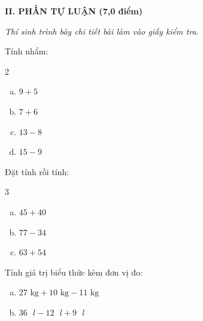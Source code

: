 \vspace{4mm}
\textbf{\large II. PHẦN TỰ LUẬN (7,0 điểm)}

{\itshape Thí sinh trình bày chi tiết bài làm vào giấy kiểm tra.}

\begin{bt}[1,0 điểm]
Tính nhẩm:
\begin{multicols}{2}
\begin{enumerate}[a)]
  \item $9 + 5$
  \item $7 + 6$
  \item $13 - 8$
  \item $15 - 9$
\end{enumerate}
\end{multicols}
\end{bt}

\begin{bt}[1,5 điểm]
Đặt tính rồi tính:
\begin{multicols}{3}
\begin{enumerate}[a)]
  \item $45 + 40$
  \item $77 - 34$
  \item $63 + 54$
\end{enumerate}
\end{multicols}
\end{bt}

\begin{bt}[1,0 điểm]
Tính giá trị biểu thức kèm đơn vị đo:
\begin{enumerate}[a)]
  \item $27\text{ kg} + 10\text{ kg} - 11\text{ kg}$
  \item $36\text{ }l - 12\text{ }l + 9\text{ }l$
\end{enumerate}
\end{bt}

